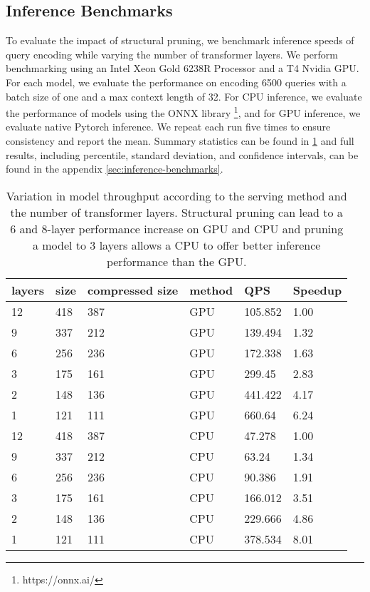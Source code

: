 \subsection{Inference Benchmarks}
To evaluate the impact of structural pruning, we benchmark inference speeds of query encoding while varying the number of transformer layers. We perform benchmarking using an Intel Xeon Gold 6238R Processor and a T4 Nvidia GPU. For each model, we evaluate the performance on encoding 6500 queries with a batch size of one and a max context length of 32. For CPU inference, we evaluate the performance of models using the ONNX library \footnote{https://onnx.ai/}, and for GPU inference, we evaluate native Pytorch inference. We repeat each run five times to ensure consistency and report the mean. Summary statistics can be found in \ref{tab:inference-summary} and full results, including percentile, standard deviation, and confidence intervals, can be found in the appendix \ref{sec:inference-benchmarks}.\\
\begin{table}[!ht]
    \centering
    \tiny
    \begin{tabular}{|l|l|l|l|l|l|}
    \hline
        layers & size & compressed size & method & QPS & Speedup \\ \hline
        12 & 418 & 387 & GPU & 105.852 & 1.00 \\ \hline
        9 & 337 & 212 & GPU & 139.494 & 1.32 \\ \hline
        6 & 256 & 236 & GPU & 172.338 & 1.63 \\ \hline
        3 & 175 & 161 & GPU & 299.45 & 2.83 \\ \hline
        2 & 148 & 136 & GPU & 441.422 & 4.17 \\ \hline
        1 & 121 & 111 & GPU & 660.64 & 6.24 \\ \hline
        12 & 418 & 387 & CPU & 47.278 & 1.00 \\ \hline
        9 & 337 & 212 & CPU & 63.24 & 1.34 \\ \hline
        6 & 256 & 236 & CPU & 90.386 & 1.91 \\ \hline
        3 & 175 & 161 & CPU & 166.012 & 3.51 \\ \hline
        2 & 148 & 136 & CPU & 229.666 & 4.86 \\ \hline
        1 & 121 & 111 & CPU & 378.534 & 8.01 \\ \hline
    \end{tabular}
    \caption{Variation in model throughput according to the serving method and the number of transformer layers. Structural pruning can lead to a 6 and 8-layer performance increase on GPU and CPU and pruning a model to 3 layers allows a CPU to offer better inference performance than the GPU.}
    \label{tab:inference-summary}
\end{table}